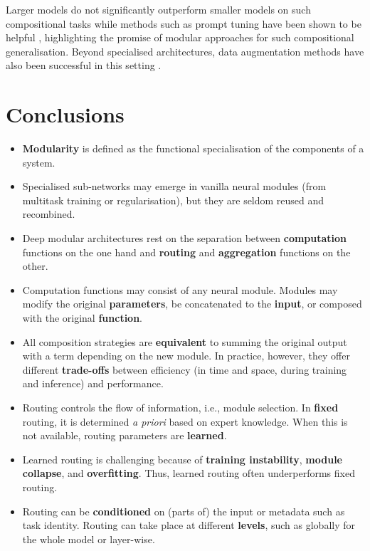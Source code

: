 \documentclass[10pt]{article} %
\begin{document}
Larger models do not significantly outperform smaller models on such compositional tasks while methods such as prompt tuning have been shown to be helpful \citep{Qiu2022}, highlighting the promise of modular approaches for such compositional generalisation. Beyond specialised architectures, data augmentation methods have also been successful in this setting \citep{Akyurek2021,yang-etal-2022-subs}.
\fi

\section{Conclusions}

\begin{tcolorbox}{%
    \begin{itemize}
      \setlength\itemsep{-.1em}
        \item \textbf{Modularity} is defined as the functional specialisation of the components of a system. 
        \item Specialised sub-networks may emerge in vanilla neural modules (from multitask training or regularisation), but they are seldom reused and recombined.
        \item Deep modular architectures rest on the separation between \textbf{computation} functions on the one hand and \textbf{routing} and \textbf{aggregation} functions on the other.
        \item Computation functions may consist of any neural module. Modules may modify the original \textbf{parameters}, be concatenated to the \textbf{input}, or composed with the original \textbf{function}.  
        \item All composition strategies are \textbf{equivalent} to summing the original output with a term depending on the new module. In practice, however, they offer different \textbf{trade-offs} between efficiency (in time and space, during training and inference) and performance.
        \item Routing controls the flow of information, i.e., module selection. In \textbf{fixed} routing, it is determined \textit{a priori} based on expert knowledge. When this is not available, routing parameters are \textbf{learned}.
        \item Learned routing is challenging because of \textbf{training instability}, \textbf{module collapse}, and \textbf{overfitting}. Thus, learned routing often underperforms fixed routing.
        \item Routing can be \textbf{conditioned} on (parts of) the input or metadata such as task identity. Routing can take place at different \textbf{levels}, such as {globally} for the whole model or {layer-wise}.

\end{itemize}}
\end{tcolorbox}
\end{document}
